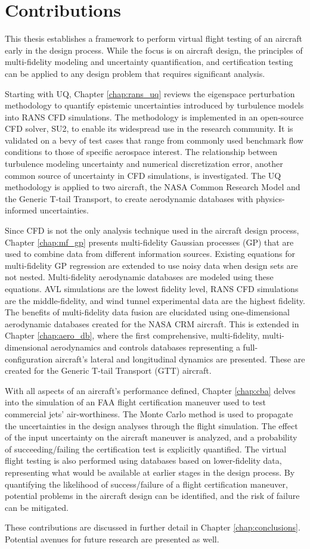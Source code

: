 \section{Contributions} \label{intro_contributions}

This thesis establishes a framework to perform virtual flight testing of an aircraft early in the design process.
While the focus is on aircraft design, the principles of multi-fidelity modeling and uncertainty quantification, and certification testing can be applied to any design problem that requires significant analysis. 

Starting with UQ, Chapter \ref{chap:rans_uq} reviews the eigenspace perturbation methodology to quantify epistemic uncertainties introduced by turbulence models into RANS CFD simulations.
The methodology is implemented in an open-source CFD solver, SU2, to enable its widespread use in the research community. 
It is validated on a bevy of test cases that range from commonly used benchmark flow conditions to those of specific aerospace interest. 
The relationship between turbulence modeling uncertainty and numerical discretization error, another common source of uncertainty in CFD simulations, is investigated.
The UQ methodology is applied to two aircraft, the NASA Common Research Model and the Generic T-tail Transport, to create aerodynamic databases with physics-informed uncertainties. 

Since CFD is not the only analysis technique used in the aircraft design process, Chapter \ref{chap:mf_gp} presents multi-fidelity Gaussian processes (GP) that are used to combine data from different information sources. 
Existing equations for multi-fidelity GP regression are extended to use noisy data when design sets are not nested.
Multi-fidelity aerodynamic databases are modeled using these equations.
AVL simulations are the lowest fidelity level, RANS CFD simulations are the middle-fidelity, and wind tunnel experimental data are the highest fidelity.
The benefits of multi-fidelity data fusion are elucidated using one-dimensional aerodynamic databases created for the NASA CRM aircraft. 
This is extended in Chapter \ref{chap:aero_db}, where the first comprehensive, multi-fidelity, multi-dimensional aerodynamics and controls databases representing a full-configuration aircraft's lateral and longitudinal dynamics are presented. 
These are created for the Generic T-tail Transport (GTT) aircraft.

With all aspects of an aircraft's performance defined, Chapter \ref{chap:cba} delves into the simulation of an FAA flight certification maneuver used to test commercial jets' air-worthiness.
The Monte Carlo method is used to propagate the uncertainties in the design analyses through the flight simulation.
The effect of the input uncertainty on the aircraft maneuver is analyzed, and a probability of succeeding/failing the certification test is explicitly quantified. 
The virtual flight testing is also performed using databases based on lower-fidelity data, representing what would be available at earlier stages in the design process.
By quantifying the likelihood of success/failure of a flight certification maneuver, potential problems in the aircraft design can be identified, and the risk of failure can be mitigated. 

These contributions are discussed in further detail in Chapter \ref{chap:conclusions}.
Potential avenues for future research are presented as well. 